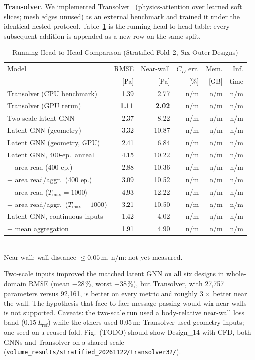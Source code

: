 \documentclass[journal]{IEEEtran}
\begin{document}
\textbf{Transolver.} We implemented Transolver~\cite{wu2024transolver}
(physics-attention over learned soft slices; mesh edges unused) as an external
benchmark and trained it under the identical nested protocol.
Table~\ref{tab:h2h} is the running head-to-head table; every subsequent
addition is appended as a new row on the same split.

\begin{table}[!t]
\centering
\caption{Running Head-to-Head Comparison (Stratified Fold~2, Six Outer Designs)}
\label{tab:h2h}
\setlength{\tabcolsep}{3pt}
\begin{tabular}{lrrrrr}
\toprule
Model & RMSE & Near-wall & $C_D$ err. & Mem. & Inf. \\
 & [Pa] & [Pa] & [\%] & [GB] & time \\
\midrule
Transolver (CPU benchmark) & 1.39 & 2.77 & n/m & n/m & n/m \\
Transolver (GPU rerun) & \textbf{1.11} & \textbf{2.02} & n/m & n/m & n/m \\
Two-scale latent GNN & 2.37 & 8.22 & n/m & n/m & n/m \\
Latent GNN (geometry) & 3.32 & 10.87 & n/m & n/m & n/m \\
Latent GNN (geometry, GPU) & 2.41 & 6.84 & n/m & n/m & n/m \\
Latent GNN, 400-ep.\ anneal & 4.15 & 10.22 & n/m & n/m & n/m \\
\quad + area read (400 ep.) & 2.88 & 10.36 & n/m & n/m & n/m \\
\quad + area read/aggr.\ (400 ep.) & 3.09 & 10.52 & n/m & n/m & n/m \\
\quad + area read ($T_\mathrm{max}{=}1000$) & 4.93 & 12.22 & n/m & n/m & n/m \\
\quad + area read/aggr.\ ($T_\mathrm{max}{=}1000$) & 3.21 & 10.50 & n/m & n/m & n/m \\
Latent GNN, continuous inputs & 1.42 & 4.02 & n/m & n/m & n/m \\
\quad + mean aggregation & 1.91 & 4.90 & n/m & n/m & n/m \\
\bottomrule
\end{tabular}
\\[2pt]
\footnotesize Near-wall: wall distance $\le0.05$\,m. n/m: not yet measured.
\end{table}

Two-scale inputs improved the matched latent GNN on all six designs in
whole-domain RMSE (mean $-28$\,\%, worst $-38$\,\%), but Transolver, with
27{,}757 parameters versus 92{,}161, is better on every metric and roughly
$3\times$ better near the wall. The hypothesis that face-to-face message passing
would win near walls is not supported. Caveats: the two-scale run used a
body-relative near-wall loss band ($0.15\,L_\mathrm{ref}$) while the others used
0.05\,m; Transolver used geometry inputs; one seed on a reused fold.
Fig.~(TODO) should show Design\_14 with CFD, both GNNs and Transolver on a
shared scale (\texttt{volume\_results/stratified\_20261122/transolver32/}).
\end{document}
